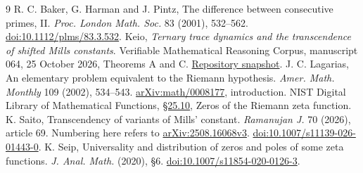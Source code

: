 \documentclass[11pt]{article}
\begin{document}
\begin{thebibliography}{9}
 R. C. Baker, G. Harman and J. Pintz, The difference between consecutive primes, II. \emph{Proc. London Math. Soc.} 83 (2001), 532--562. \href{https://doi.org/10.1112/plms/83.3.532}{doi:10.1112/plms/83.3.532}.
 Keio, \emph{Ternary trace dynamics and the transcendence of shifted Mills constants}. Verifiable Mathematical Reasoning Corpus, manuscript 064, 25 October 2026, Theorems A and C. \href{https://github.com/QEEDDD/Verifiable-Mathematical-Reasoning-Corpus/tree/ecd87de3348dcb706a76bb12fde722d7a348a012}{Repository snapshot}.
 J. C. Lagarias, An elementary problem equivalent to the Riemann hypothesis. \emph{Amer. Math. Monthly} 109 (2002), 534--543. \href{https://arxiv.org/abs/math/0008177}{arXiv:math/0008177}, introduction.
 NIST Digital Library of Mathematical Functions, \href{https://dlmf.nist.gov/25.10}{\S25.10}, Zeros of the Riemann zeta function.
 K. Saito, Transcendency of variants of Mills' constant. \emph{Ramanujan J.} 70 (2026), article 69. Numbering here refers to \href{https://arxiv.org/html/2508.16068v3}{arXiv:2508.16068v3}. \href{https://doi.org/10.1007/s11139-026-01443-0}{doi:10.1007/s11139-026-01443-0}.
 K. Seip, Universality and distribution of zeros and poles of some zeta functions. \emph{J. Anal. Math.} (2020), \S6. \href{https://doi.org/10.1007/s11854-020-0126-3}{doi:10.1007/s11854-020-0126-3}.
\end{thebibliography}
\end{document}
